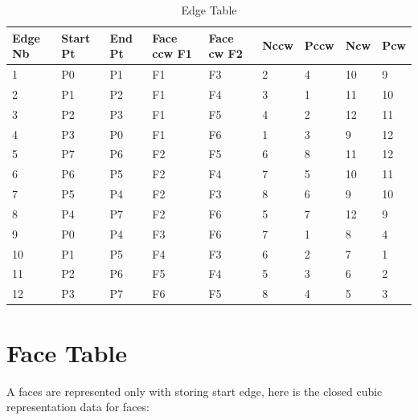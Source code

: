\documentclass{article}
\begin{document}
\begin{table}[H]
\centering
    \begin{tabular}{|l|l|l|l|l|l|l|l|l|}
    \hline
    Edge Nb & Start Pt & End Pt & Face ccw F1 & Face cw F2 & Nccw & Pccw & Ncw & Pcw \\ \hline
    1       & P0       & P1     & F1          & F3         & 2    & 4    & 10  & 9   \\ \hline
    2       & P1       & P2     & F1          & F4         & 3    & 1    & 11  & 10  \\ \hline
    3       & P2       & P3     & F1          & F5         & 4    & 2    & 12  & 11  \\ \hline
    4       & P3       & P0     & F1          & F6         & 1    & 3    & 9   & 12  \\ \hline
    5       & P7       & P6     & F2          & F5         & 6    & 8    & 11  & 12  \\ \hline
    6       & P6       & P5     & F2          & F4         & 7    & 5    & 10  & 11  \\ \hline
    7       & P5       & P4     & F2          & F3         & 8    & 6    & 9   & 10  \\ \hline
    8       & P4       & P7     & F2          & F6         & 5    & 7    & 12  & 9   \\ \hline
    9       & P0       & P4     & F3          & F6         & 7    & 1    & 8   & 4   \\ \hline
    10      & P1       & P5     & F4          & F3         & 6    & 2    & 7   & 1   \\ \hline
    11      & P2       & P6     & F5          & F4         & 5    & 3    & 6   & 2   \\ \hline
    12      & P3       & P7     & F6          & F5         & 8    & 4    & 5   & 3   \\ \hline
    \end{tabular}
    \caption {Edge Table}
\end{table}

\section{Face Table}

A faces are represented only with storing start edge, here is the closed cubic representation data for faces:
\end{document}
